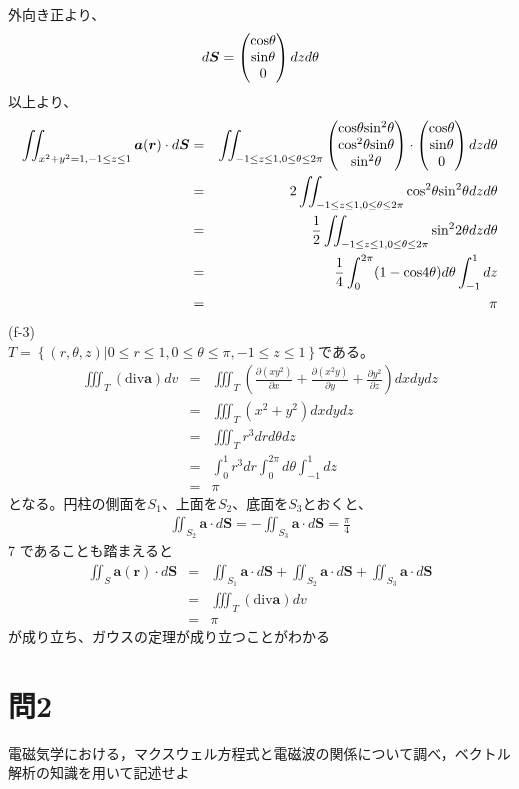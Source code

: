 \documentclass[pdflatex,ja=standard,fleqn]{bxjsarticle}
\begin{document}
外向き正より、
\begin{eqnarray*}
    d\boldsymbol{S}=\begin{pmatrix}{\rm cos}\theta\\{\rm sin}\theta\\0\end{pmatrix}dzd\theta
\end{eqnarray*}
以上より、
\begin{eqnarray*}
    \iint_{x^2+y^2=1,-1\leq z\leq1} \boldsymbol{a}(\boldsymbol{r})\cdot d\boldsymbol{S}&=&\iint_{-1\leq z\leq 1,0\leq\theta\leq 2\pi} \begin{pmatrix}{\rm cos}\theta{\rm sin^2}\theta\\{\rm cos^2}\theta{\rm sin}\theta\\{\rm sin^2}\theta\end{pmatrix}\cdot\begin{pmatrix}{\rm cos}\theta\\{\rm sin}\theta\\0\end{pmatrix}dzd\theta\\
    &=&2\iint_{-1\leq z\leq 1,0\leq\theta\leq 2\pi} {\rm cos^2}\theta{\rm sin^2}\theta dzd\theta\\
    &=&\frac{1}{2}\iint_{-1\leq z\leq 1,0\leq\theta\leq 2\pi} {\rm sin^2}2\theta dzd\theta\\
    &=&\frac{1}{4}\int_{0}^{2\pi} (1-{\rm cos}4\theta)d\theta\int_{-1}^{1} dz\\
    &=&\pi
\end{eqnarray*}
(f-3)\\
$T=\left\{(r,\theta,z)|0\leq r\leq 1,0\leq \theta\leq\pi,-1\leq z\leq 1\right\}$である。
\begin{eqnarray*}
    \iiint_T (\mathrm{div}\boldsymbol{a})dv&=&\iiint_T \left(\frac{\partial (xy^2)}{\partial x}+\frac{\partial (x^2y)}{\partial y}+\frac{\partial y^2}{\partial z}\right)dxdydz\\
    &=&\iiint_T (x^2+y^2)dxdydz\\
    &=&\iiint_T r^3drd\theta dz\\
    &=&\int_{0}^{1} r^3dr\int_{0}^{2\pi} d\theta\int_{-1}^{1} dz\\
    &=&\pi
\end{eqnarray*}
となる。円柱の側面を$S_{1}$、上面を$S_{2}$、底面を$S_{3}$とおくと、
\begin{eqnarray*}
    \iint_{S_{2}} \boldsymbol{a}\cdot d\boldsymbol{S}=-\iint_{S_{3}} \boldsymbol{a}\cdot d\boldsymbol{S}=\frac{\pi}{4}
\end{eqnarray*}7
であることも踏まえると
\begin{eqnarray*}
    \iint_S \boldsymbol{a}(\boldsymbol{r})\cdot d\boldsymbol{S}&=&\iint_{S_{1}} \boldsymbol{a}\cdot d\boldsymbol{S}+\iint_{S_{2}} \boldsymbol{a}\cdot d\boldsymbol{S}+\iint_{S_{3}} \boldsymbol{a}\cdot d\boldsymbol{S}\\
    &=&\iiint_T (\mathrm{div}\boldsymbol{a})dv\\
    &=&\pi
\end{eqnarray*}
が成り立ち、ガウスの定理が成り立つことがわかる
\section*{問2}
\begin{screen}
    電磁気学における，マクスウェル方程式と電磁波の関係について調べ，ベクトル解析の知識を用いて記述せよ
\end{screen}
\end{document}
